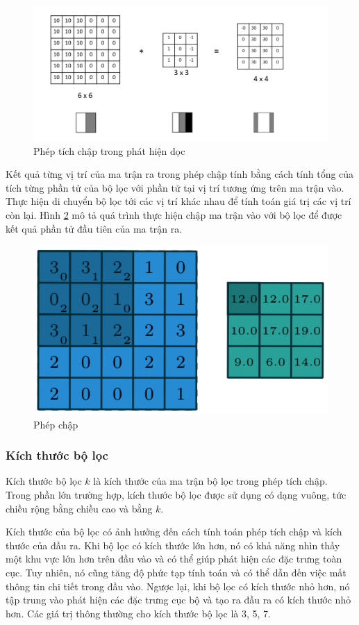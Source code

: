 \begin{figure}[h]
	\centering
	\includegraphics[width=0.8\linewidth]{images/edge-detection-conv}
	\caption{Phép tích chập trong phát hiện dọc}
	\label{fig:edge-detection-conv}
\end{figure}

Kết quả từng vị trí của ma trận ra trong phép chập tính bằng cách tính tổng của tích từng phần tử của bộ lọc với phần tử tại vị trí tương ứng trên ma trận vào. Thực hiện di chuyển bộ lọc tới các vị trí khác nhau để tính toán giá trị các vị trí còn lại. Hình \ref{fig:conv-operation} mô tả quá trình thực hiện chập ma trận vào với bộ lọc để được kết quả phần tử đầu tiên của ma trận ra.

\begin{figure}
	\centering
	\includegraphics[width=0.6\linewidth]{images/conv-operation}
	\caption{Phép chập}
	\label{fig:conv-operation}
\end{figure}


\subsubsection{Kích thước bộ lọc}

Kích thước bộ lọc $k$ là kích thước của ma trận bộ lọc trong phép tích chập. Trong phần lớn trường hợp, kích thước bộ lọc được sử dụng có dạng vuông, tức chiều rộng bằng chiều cao và bằng $k$. 

Kích thước của bộ lọc có ảnh hưởng đến cách tính toán phép tích chập và kích thước của đầu ra. Khi bộ lọc có kích thước lớn hơn, nó có khả năng nhìn thấy một khu vực lớn hơn trên đầu vào và có thể giúp phát hiện các đặc trưng toàn cục. Tuy nhiên, nó cũng tăng độ phức tạp tính toán và có thể dẫn đến việc mất thông tin chi tiết trong đầu vào. Ngược lại, khi bộ lọc có kích thước nhỏ hơn, nó tập trung vào phát hiện các đặc trưng cục bộ và tạo ra đầu ra có kích thước nhỏ hơn. Các giá trị thông thường cho kích thước bộ lọc là 3, 5, 7.

